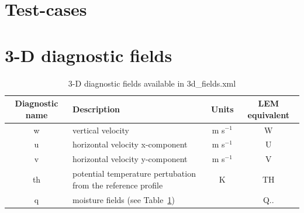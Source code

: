 \documentclass[a4paper,11pt]{article}
\begin{document}
\section{Test-cases}



\appendix

\section{3-D diagnostic fields}

\begin{table}[H]
  \protect\caption{3-D diagnostic fields available in 3d\_fields.xml}
\label{tab:3d-fields}
\begin{tabular}{|c|p{7cm}|c|c|}
\hline
 Diagnostic name & Description & Units & LEM equivalent \tabularnewline
\hline
   w & vertical velocity & m s$^{-1}$ & W \tabularnewline
\hline
   u & horizontal velocity x-component & m s$^{-1}$ & U \tabularnewline
\hline
   v & horizontal velocity y-component & m s$^{-1}$ & V \tabularnewline
\hline
   th & potential temperature pertubation from the reference profile & K & TH \tabularnewline
\hline
   q & moisture fields (see Table~\ref{tab:3d-fields}) &  & Q.. \tabularnewline
\hline
\hline
\end{tabular}
\end{table}
\end{document}

